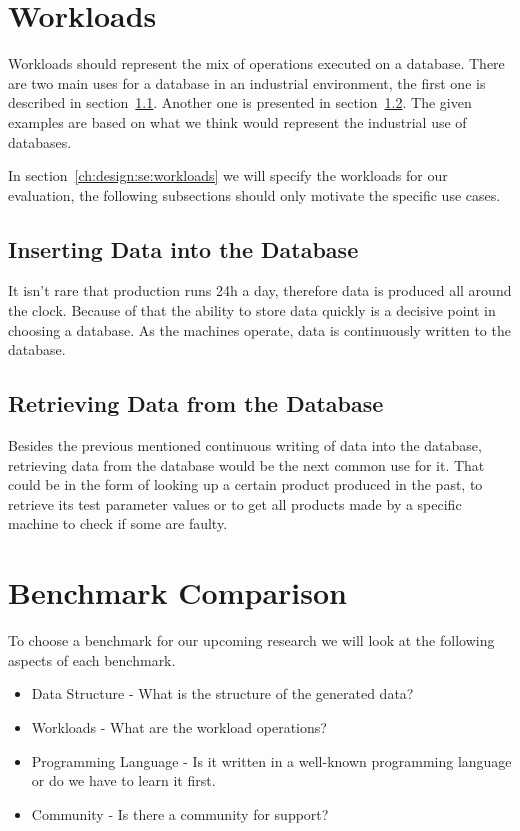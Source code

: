 \section{Workloads}
\label{ch:analysis:se:workloads}
Workloads should represent the mix of operations executed on a database.
There are two main uses for a database in an industrial environment,
the first one is described in section~\ref{ch:analysis:se:insertingData}.
Another one is presented in section~\ref{ch:analysis:se:retrievingData}.
The given examples are based on what we think would represent the industrial use of databases.

In section~\ref{ch:design:se:workloads} we will specify the workloads for our evaluation,
the following subsections should only motivate the specific use cases.

\subsection{Inserting Data into the Database}
\label{ch:analysis:se:insertingData}
It isn't rare that production runs 24h a day,
therefore data is produced all around the clock.
Because of that the ability to store data quickly is a decisive point in choosing a database.
As the machines operate,
data is continuously written to the database.

\subsection{Retrieving Data from the Database}
\label{ch:analysis:se:retrievingData}
Besides the previous mentioned continuous writing of data into the database,
retrieving data from the database would be the next common use for it.
That could be in the form of looking up a certain product produced in the past,
to retrieve its test parameter values or to get all products made by a specific machine to check if some are faulty.

\section{Benchmark Comparison}
\label{ch:analysis:se:benchmark}
To choose a benchmark for our upcoming research we will look at the following aspects of each benchmark.

\begin{itemize}
  \item Data Structure - What is the structure of the generated data?
  \item Workloads - What are the workload operations?
  \item Programming Language - Is it written in a well-known programming language or do we have to learn it first.
  \item Community - Is there a community for support?
\end{itemize}

